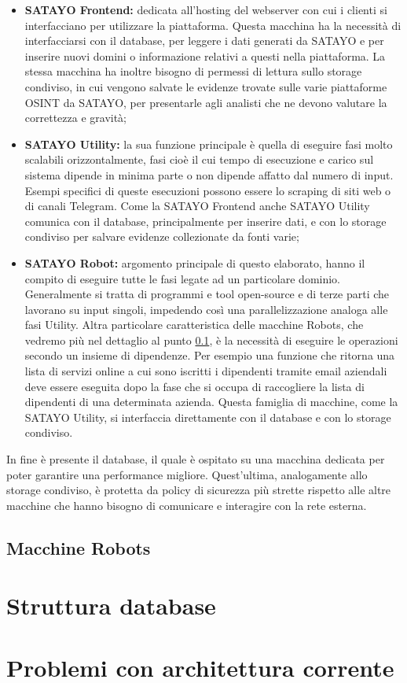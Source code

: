 \begin{itemize}
  \item \textbf{SATAYO Frontend:} dedicata all'hosting del webserver con cui i
    clienti si interfacciano per utilizzare la piattaforma. Questa macchina ha la
    necessità di interfacciarsi con il database, per leggere i dati generati da
    SATAYO e per inserire nuovi domini o informazione relativi a questi nella
    piattaforma. La stessa macchina ha inoltre bisogno di permessi di lettura sullo
    storage condiviso, in cui vengono salvate le evidenze trovate sulle varie
    piattaforme OSINT da SATAYO, per presentarle agli analisti che ne devono valutare
    la correttezza e gravità;

  \item \textbf{SATAYO Utility:} la sua funzione principale è quella di eseguire
    fasi molto scalabili orizzontalmente, fasi cioè il cui tempo di esecuzione e
    carico sul sistema dipende in minima parte o non dipende affatto dal numero di
    input. Esempi specifici di queste esecuzioni possono essere lo scraping di
    siti web o di canali Telegram. Come la SATAYO Frontend anche SATAYO Utility comunica
    con il database, principalmente per inserire dati, e con lo storage condiviso
    per salvare evidenze collezionate da fonti varie;

  \item \textbf{SATAYO Robot:} argomento principale di questo elaborato, hanno il
    compito di eseguire tutte le fasi legate ad un particolare dominio.
    Generalmente si tratta di programmi e tool open-source e di terze parti che
    lavorano su input singoli, impedendo così una parallelizzazione analoga alle
    fasi Utility. Altra particolare caratteristica delle macchine Robots, che vedremo
    più nel dettaglio al punto \ref{sub:robots}, è la necessità di eseguire le
    operazioni secondo un insieme di dipendenze. Per esempio una funzione che ritorna
    una lista di servizi online a cui sono iscritti i dipendenti tramite email aziendali
    deve essere eseguita dopo la fase che si occupa di raccogliere la lista di dipendenti
    di una determinata azienda. Questa famiglia di macchine, come la SATAYO Utility,
    si interfaccia direttamente con il database e con lo storage condiviso.
\end{itemize}

In fine è presente il database, il quale è ospitato su una macchina dedicata per
poter garantire una performance migliore. Quest'ultima, analogamente allo storage
condiviso, è protetta da policy di sicurezza più strette rispetto alle altre
macchine che hanno bisogno di comunicare e interagire con la rete esterna.

\subsection{Macchine Robots}
\label{sub:robots}

\lipsum[1]

\section{Struttura database}
\label{sec:database}

\lipsum[1]

\section{Problemi con architettura corrente}
\label{sec:problemi}

\lipsum[1]